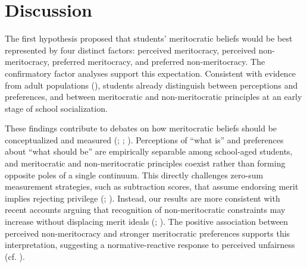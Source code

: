 \documentclass[
  13pt,
]{article}
\begin{document}
\section{Discussion}\label{discussion}

The first hypothesis proposed that students' meritocratic beliefs would
be best represented by four distinct factors: perceived meritocracy,
perceived non-meritocracy, preferred meritocracy, and preferred
non-meritocracy. The confirmatory factor analyses support this
expectation. Consistent with evidence from adult populations
(),
students already distinguish between perceptions and preferences, and
between meritocratic and non-meritocratic principles at an early stage
of school socialization.

These findings contribute to debates on how meritocratic beliefs should
be conceptualized and measured
(;
;
). Perceptions of ``what
is'' and preferences about ``what should be'' are empirically separable
among school-aged students, and meritocratic and non-meritocratic
principles coexist rather than forming opposite poles of a single
continuum. This directly challenges zero-sum measurement strategies,
such as subtraction scores, that assume endorsing merit implies
rejecting privilege (; ). Instead, our results are more consistent with recent accounts
arguing that recognition of non-meritocratic constraints may increase
without displacing merit ideals (; ).
The positive association between perceived non-meritocracy and stronger
meritocratic preferences supports this interpretation, suggesting a
normative-reactive response to perceived unfairness (cf.
).
\end{document}
